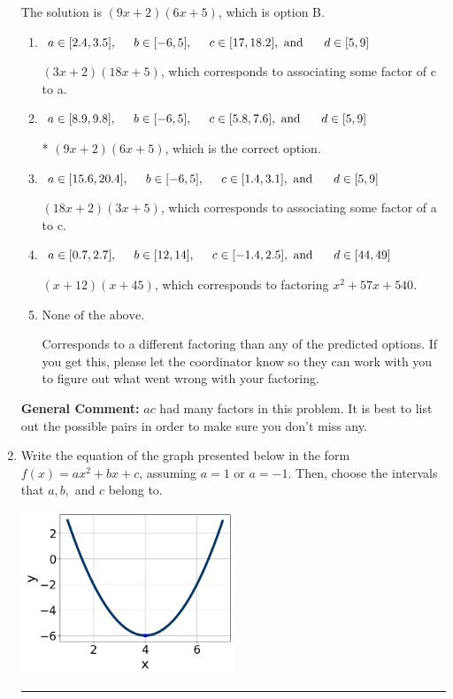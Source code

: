 \documentclass{extbook}[14pt]
\newcommand{\litem}[1]{\item #1

\rule{\textwidth}{0.4pt}}
\begin{document}
\begin{enumerate}
{The solution is \( (9x + 2)(6x + 5) \), which is option B.\begin{enumerate}[label=\Alph*.]
\item \( a \in [2.4, 3.5], \hspace*{5mm} b \in [-6, 5], \hspace*{5mm} c \in [17, 18.2], \text{ and } \hspace*{5mm} d \in [5, 9] \)

 $(3x + 2)(18x + 5)$, which corresponds to associating some factor of c to a.
\item \( a \in [8.9, 9.8], \hspace*{5mm} b \in [-6, 5], \hspace*{5mm} c \in [5.8, 7.6], \text{ and } \hspace*{5mm} d \in [5, 9] \)

* $(9x + 2)(6x + 5)$, which is the correct option.
\item \( a \in [15.6, 20.4], \hspace*{5mm} b \in [-6, 5], \hspace*{5mm} c \in [1.4, 3.1], \text{ and } \hspace*{5mm} d \in [5, 9] \)

 $(18x + 2)(3x + 5)$, which corresponds to associating some factor of a to c.
\item \( a \in [0.7, 2.7], \hspace*{5mm} b \in [12, 14], \hspace*{5mm} c \in [-1.4, 2.5], \text{ and } \hspace*{5mm} d \in [44, 49] \)

 $(x + 12)(x + 45)$, which corresponds to factoring $x^{2} +57 x + 540$.
\item \( \text{None of the above.} \)

 Corresponds to a different factoring than any of the predicted options. If you get this, please let the coordinator know so they can work with you to figure out what went wrong with your factoring.
\end{enumerate}

\textbf{General Comment:} $ac$ had many factors in this problem. It is best to list out the possible pairs in order to make sure you don't miss any.
}
\litem{
Write the equation of the graph presented below in the form $f(x)=ax^2+bx+c$, assuming  $a=1$ or $a=-1$. Then, choose the intervals that $a, b,$ and $c$ belong to.

\begin{center}
    \includegraphics[width=0.5\textwidth]{../Figures/quadraticGraphToEquationCopyA.png}
\end{center}




}
\end{enumerate}
\end{document}
